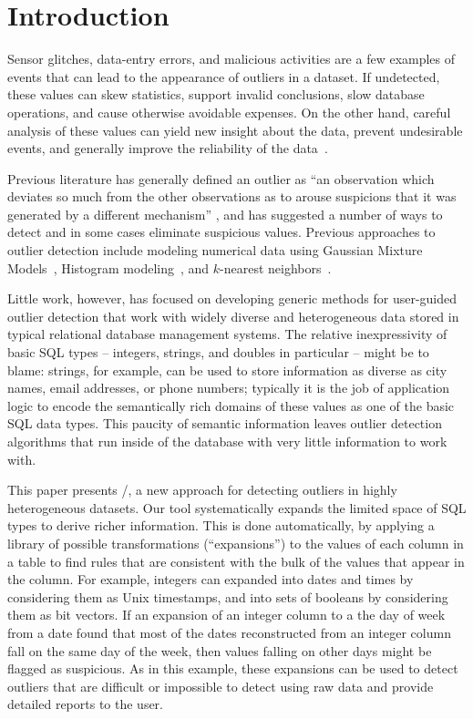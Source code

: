 \section{Introduction}
\label{sec:intro}

Sensor glitches, data-entry errors, and malicious activities are a few examples of events that can lead to the appearance of outliers in a dataset. If undetected, these values can skew statistics, support invalid conclusions, slow database operations, and cause otherwise avoidable expenses. On the other hand, careful analysis of these values can yield new insight about the data, prevent undesirable events, and generally improve the reliability of the data~\cite{Achour2014}.

Previous literature has generally defined an outlier as ``an observation which deviates so much from the other observations as to arouse suspicions that it was generated by a different mechanism'' \cite{Hawkins1980}, and has suggested a number of ways to detect and in some cases eliminate suspicious values. Previous approaches to outlier detection include modeling numerical data using Gaussian Mixture Models~\cite{Lu2005,Roberts1994,Roberts1999}, Histogram modeling~\cite{Gebski2007,Sheng2007}, and $k$-nearest neighbors~\cite{Ramaswamy2000}.

Little work, however, has focused on developing generic methods for user-guided outlier detection that work with widely diverse and heterogeneous data stored in typical relational database management systems. The relative inexpressivity of basic SQL types -- integers, strings, and doubles in particular -- might be to blame: strings, for example, can be used to store information as diverse as city names, email addresses, or phone numbers; typically it is the job of application logic to encode the semantically rich domains of these values as one of the basic SQL data types. This paucity of semantic information leaves outlier detection algorithms that run inside of the database with very little information to work with.

This paper presents \dBoost/, a new approach for detecting outliers in highly heterogeneous datasets.
Our tool systematically expands the limited space of SQL types to derive richer information.
This is done automatically, by applying a library of possible transformations (``expansions'') to the values of each column in a table to find rules that are consistent with the bulk of the values that appear in the column.
For example, integers can expanded into dates and times by considering them as Unix timestamps, and into sets of booleans by considering them as bit vectors.
If an expansion of an integer column to a the day of week from a date found that most of the dates reconstructed from an integer column fall on the same day of the week, then values falling on other days might be flagged as suspicious.
As in this example, these expansions  can be used to detect outliers that are difficult or impossible to detect using raw data and provide detailed reports to the user.


